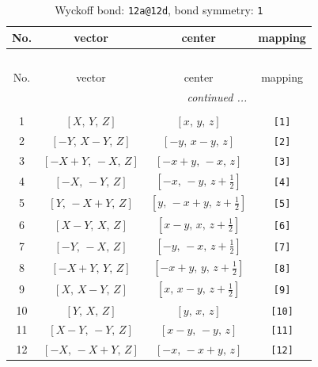 \documentclass[fleqn,8pt]{jsarticle}
\begin{document}
\renewcommand{\arraystretch}{1.2}
\begin{longtable}{cccc}
\caption{Wyckoff bond: {\tt 12a@12d}, bond symmetry: {\tt 1}}
 \\
 \hline \hline
No. & vector & center & mapping \\ \hline \endfirsthead

\multicolumn{3}{l}{\tablename\ \thetable{}} \\
 \hline \hline
No. & vector & center & mapping \\ \hline \endhead

 \hline \hline
\multicolumn{3}{r}{\footnotesize\it continued ...} \\ \endfoot

 \hline \hline
\multicolumn{3}{r}{} \\ \endlastfoot

1 & $\left[ X,\, Y,\, Z \right]$ & $\left[ x,\, y,\, z \right]$ & {\tt [1]} \\ \hline
2 & $\left[ - Y,\, X - Y,\, Z \right]$ & $\left[ - y,\, x - y,\, z \right]$ & {\tt [2]} \\ \hline
3 & $\left[ - X + Y,\, - X,\, Z \right]$ & $\left[ - x + y,\, - x,\, z \right]$ & {\tt [3]} \\ \hline
4 & $\left[ - X,\, - Y,\, Z \right]$ & $\left[ - x,\, - y,\, z + \frac{1}{2} \right]$ & {\tt [4]} \\ \hline
5 & $\left[ Y,\, - X + Y,\, Z \right]$ & $\left[ y,\, - x + y,\, z + \frac{1}{2} \right]$ & {\tt [5]} \\ \hline
6 & $\left[ X - Y,\, X,\, Z \right]$ & $\left[ x - y,\, x,\, z + \frac{1}{2} \right]$ & {\tt [6]} \\ \hline
7 & $\left[ - Y,\, - X,\, Z \right]$ & $\left[ - y,\, - x,\, z + \frac{1}{2} \right]$ & {\tt [7]} \\ \hline
8 & $\left[ - X + Y,\, Y,\, Z \right]$ & $\left[ - x + y,\, y,\, z + \frac{1}{2} \right]$ & {\tt [8]} \\ \hline
9 & $\left[ X,\, X - Y,\, Z \right]$ & $\left[ x,\, x - y,\, z + \frac{1}{2} \right]$ & {\tt [9]} \\ \hline
10 & $\left[ Y,\, X,\, Z \right]$ & $\left[ y,\, x,\, z \right]$ & {\tt [10]} \\ \hline
11 & $\left[ X - Y,\, - Y,\, Z \right]$ & $\left[ x - y,\, - y,\, z \right]$ & {\tt [11]} \\ \hline
12 & $\left[ - X,\, - X + Y,\, Z \right]$ & $\left[ - x,\, - x + y,\, z \right]$ & {\tt [12]} \\
\end{longtable}
\end{document}
